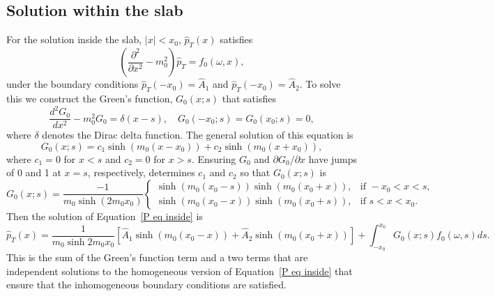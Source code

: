 \documentclass[12pt]{article}
\begin{document}
\subsection{Solution within the slab}
For the solution inside the slab, $|x| < x_0$, $\hat{p}_T(x)$ satisfies
\begin{equation}
\left( \frac{\partial^2}{\partial x^2} - m_0^2 \right) \hat{p}_T = f_0(\omega, x),
\end{equation}
under the boundary conditions $\hat{p}_T(-x_0) = \hat{A}_1$ and $\hat{p}_T(-x_0) = \hat{A}_2$. To solve this we construct the Green's function, $G_0(x;s)$ that satisfies
\begin{equation}
\frac{d^2G_0}{dx^2} - m_0^2 G_0 = \delta(x-s), \quad G_0(-x_0;s) = G_0(x_0;s) = 0,
\end{equation}
where $\delta$ denotes the Dirac delta function. The general solution of this equation is
\begin{equation}
G_0(x;s) = c_1\sinh(m_0(x - x_0)) + c_2\sinh(m_0(x + x_0)),
\end{equation}
where $c_1 = 0$ for $x < s$ and $c_2 = 0$ for $x > s$. Ensuring $G_0$ and $\partial G_0 / \partial x$ have jumps of 0 and 1 at $x = s$, respectively, determines $c_1$ and $c_2$ so that $G_0(x;s)$ is
\begin{equation}
G_0(x;s) = \frac{-1}{m_0\sinh(2m_0 x_0)}
\begin{cases}
\sinh(m_0(x_0 - s))\sinh(m_0(x_0 + x)), & \text{if } -x_0<x<s, \\
\sinh(m_0(x_0 - x))\sinh(m_0(x_0 + s)), & \text{if } s<x<x_0.
\end{cases}
\end{equation}
Then the solution of Equation~\eqref{P eq inside} is
\begin{equation}
\hat{p}_T(x) = \frac{1}{m_0\sinh{2m_0 x_0}} \left[ \hat{A}_1\sinh(m_0(x_0 - x)) + \hat{A}_2\sinh(m_0(x_0 + x)) \right] + \int_{-x_0}^{x_0} G_0(x;s) f_0(\omega, s) ds.
\label{P sol 0}
\end{equation}
This is the sum of the Green's function term and a two terms that are independent solutions to the homogeneous version of Equation~\eqref{P eq inside} that ensure that the inhomogeneous boundary conditions are satisfied.
\end{document}
